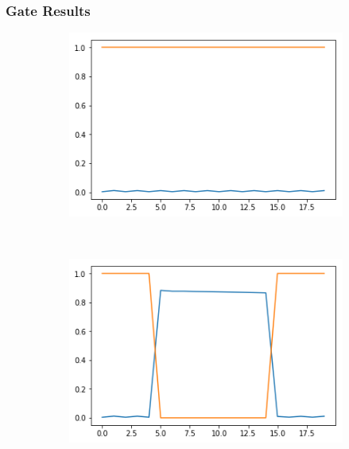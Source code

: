 \documentclass[12pt, letterpaper]{article}
\begin{document}
\subsubsection{Gate Results}
\begin{figure}[h]
    \centering
    \begin{subfigure}[b]{0.3\textwidth}
        \includegraphics[width=\textwidth]{basic_f1}
        \label{fig:gull}
    \end{subfigure}
    ~ %
    \begin{subfigure}[b]{0.3\textwidth}
        \includegraphics[width=\textwidth]{basic_f2}
        \label{fig:tiger}
    \end{subfigure}
    ~ %

\end{figure}
\end{document}
